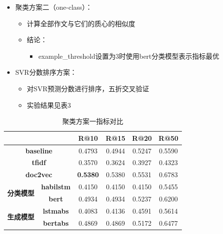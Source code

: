 \documentclass[11pt]{article}
\begin{document}
\begin{CJK}{UTF8}{gkai}
\begin{itemize}
\begin{itemize}
    \item 聚类方案二（one-class）：
    \begin{itemize}
      \item 计算全部作文与它们的质心的相似度
      \item 结论：
      \begin{itemize}
        \item example\_threshold设置为3时使用bert分类模型表示指标最优
      \end{itemize}
    \end{itemize}
    \item SVR分数排序方案：
    \begin{itemize}
      \item 对SVR预测分数进行排序，五折交叉验证
      \item 实验结果见表3
    \end{itemize}
    
  \end{itemize}
\end{itemize}

\begin{table}[htbp]
  \centering
    \begin{tabular}{c|c|c|c|c|c}
      \hline
      \multicolumn{2}{c|}{} & \textbf{R@10} & \textbf{R@15} & \textbf{R@20} & \textbf{R@50} \\
      \hline
      \multicolumn{2}{c|}{\textbf{baseline}} & 0.4793  & 0.4944  & 0.5247  & 0.5590  \\
      \hline
      \multicolumn{2}{c|}{\textbf{tfidf}} & 0.3570  & 0.3624  & 0.3927  & 0.4323  \\
      \hline
      \multicolumn{2}{c|}{\textbf{doc2vec}} & \textcolor[rgb]{ 1,  0,  0}{\textbf{0.5380 }} & 0.5380  & 0.5531  & 0.6783  \\
      \hline
      \multirow{2}[0]{*}{\textbf{分类模型}} & \textbf{habilstm} & 0.4150  & 0.4150  & 0.4150  & 0.5455  \\
      & \textbf{bert} & 0.4934  & 0.4934  & 0.5237  & 0.6200  \\
      \hline
      \multirow{2}[0]{*}{\textbf{生成模型}} & \textbf{lstmabs} & 0.4083  & 0.4136  & 0.4591  & 0.5614  \\
      & \textbf{bertabs} & 0.4869  & 0.4869  & 0.5172  & 0.6477  \\
      \hline
    \end{tabular}%
    \caption{聚类方案一指标对比}
  \label{tab:addlabel}%
\end{table}%


\end{CJK}
\end{document}
